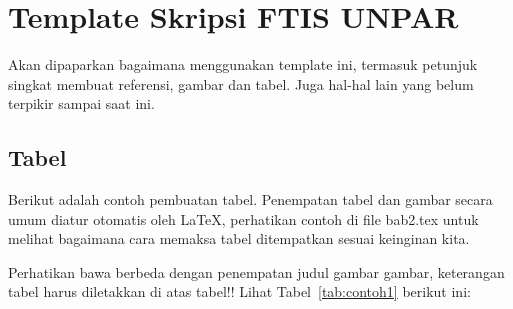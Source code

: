 \section{Template Skripsi FTIS UNPAR}
\label{sec:template}
 
Akan dipaparkan bagaimana menggunakan template ini, termasuk petunjuk singkat membuat referensi, gambar dan tabel.
Juga hal-hal lain yang belum terpikir sampai saat ini. 
 

\subsection{Tabel}  
Berikut adalah contoh pembuatan tabel. 
Penempatan tabel dan gambar secara umum diatur otomatis oleh \LaTeX{}, perhatikan contoh di file bab2.tex untuk melihat bagaimana cara memaksa tabel ditempatkan sesuai keinginan kita.

Perhatikan bawa berbeda dengan penempatan judul gambar gambar, keterangan tabel harus diletakkan di atas tabel!!
Lihat Tabel~\ref{tab:contoh1} berikut ini:

